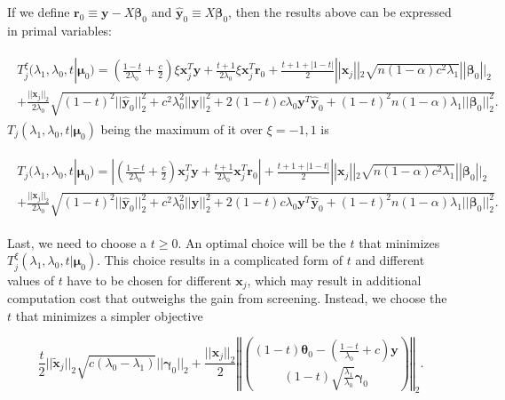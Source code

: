 If we define $\boldsymbol r_0\equiv \boldsymbol y-X\boldsymbol\beta_{0}$ and $\hat{\boldsymbol y}_{0}\equiv X\boldsymbol\beta_{0}$, then the results above can be expressed in primal variables:

\begin{gather}
    \begin{aligned}
        T^\xi_j(\lambda_1,\lambda_0,t|\boldsymbol\mu_0)=  \left(\frac{1-t}{2\lambda_0}+\frac{c}{2}\right)\xi\boldsymbol x_j^T \boldsymbol y+\frac{t+1}{2\lambda_0}\xi \boldsymbol x_j^T \boldsymbol r_{0}+\frac{t+1+|1-t|}{2}||\boldsymbol x_j||_2\sqrt{n(1-\alpha) c^2\lambda_1}||\boldsymbol\beta_{0}||_2\\
        +\frac{||\boldsymbol x_j||_2}{2\lambda_0}\sqrt{(1-t)^2||\hat{\boldsymbol y}_{0}||_2^2+c^2\lambda_0^2||\boldsymbol y||_2^2+2(1-t)c\lambda_0 \boldsymbol y^T\hat{\boldsymbol y}_{0}+(1-t)^2n(1-\alpha)\lambda_1||\boldsymbol\beta_{0}||_2^2}.
    \end{aligned}
\end{gather}
$T_j(\lambda_1,\lambda_0,t|\boldsymbol\mu_0)$ being the maximum of it over $\xi=-1,1$ is

\begin{gather}
    \label{eq:t}
    \begin{aligned}
        T_j(\lambda_1,\lambda_0,t|\boldsymbol\mu_0)= \left| \left(\frac{1-t}{2\lambda_0}+\frac{c}{2}\right)\boldsymbol x_j^T \boldsymbol y+\frac{t+1}{2\lambda_0} \boldsymbol x_j^T \boldsymbol r_{0}\right|+\frac{t+1+|1-t|}{2}||\boldsymbol x_j||_2\sqrt{n(1-\alpha) c^2\lambda_1}||\boldsymbol\beta_{0}||_2\\
        +\frac{||\boldsymbol x_j||_2}{2\lambda_0}\sqrt{(1-t)^2||\hat{\boldsymbol y}_{0}||_2^2+c^2\lambda_0^2||\boldsymbol y||_2^2+2(1-t)c\lambda_0 \boldsymbol y^T\hat{\boldsymbol y}_{0}+(1-t)^2n(1-\alpha)\lambda_1||\boldsymbol\beta_{0}||_2^2}.
    \end{aligned}
\end{gather}

Last, we need to choose a $t\geq 0$. An optimal choice will be the $t$ that minimizes $T^\xi_j(\lambda_1,\lambda_0,t|\boldsymbol\mu_0)$. This choice results in a complicated form of $t$ and different values of $t$ have to be chosen for different $\boldsymbol x_j$, which may result in additional computation cost that outweighs the gain from screening. Instead, we choose the $t$ that minimizes a simpler objective

\begin{equation}
    \frac{t}{2}||\tilde{\boldsymbol x}_j||_2\sqrt{c(\lambda_0-\lambda_1)}||\boldsymbol\gamma_{0}||_2+\frac{||\boldsymbol x_j||_2}{2}\left\Vert\binom{(1-t)\boldsymbol\theta_{0}-\left(\frac{1-t}{\lambda_0}+c\right)\boldsymbol y}{(1-t)\sqrt{\frac{\lambda_1}{\lambda_0}}\boldsymbol\gamma_{0}}\right\Vert_2.
\end{equation}

